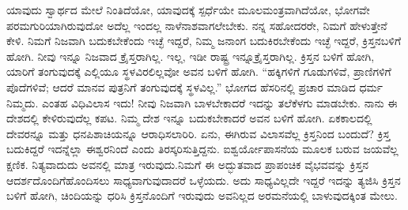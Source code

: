 ಯಾವುದು ಸ್ವಾರ್ಥದ ಮೇಲೆ ನಿಂತಿದೆಯೋ, ಯಾವುದಕ್ಕೆ ಸ್ಪರ್ಧೆಯೇ ಮೂಲ\break ಮಂತ್ರವಾಗಿದೆಯೋ, ಭೋಗವೇ ಪರಮಗುರಿಯಾಗಿರುವುದೋ ಅದೆಲ್ಲ ಇಂದಲ್ಲ ನಾಳೆ\break ನಾಶವಾಗಲೇಬೇಕು. ನನ್ನ ಸಹೋದರರೇ, ನಿಮಗೆ ಹೇಳುತ್ತೇನೆ ಕೇಳಿ. ನಿಮಗೆ ನಿಜವಾಗಿ ಬದುಕಬೇಕೆಂದು ಇಚ್ಛೆ ಇದ್ದರೆ, ನಿಮ್ಮ ಜನಾಂಗ ಬದುಕಿರಬೇಕೆಂದು ಇಚ್ಛೆ ಇದ್ದರೆ, ಕ್ರಿಸ್ತನ\break ಬಳಿಗೆ ಹೋಗಿ. ನೀವು ಇನ್ನೂ ನಿಜವಾದ ಕ್ರೈಸ್ತರಾಗಿಲ್ಲ. ಇಲ್ಲ, ಇಡೀ ರಾಷ್ಟ್ರ ಇನ್ನೂ\break ಕ್ರೈಸ್ತರಾಗಿಲ್ಲ. ಕ್ರಿಸ್ತನ ಬಳಿಗೆ ಹೋಗಿ, ಯಾರಿಗೆ ತಂಗುವುದಕ್ಕೆ ಎಲ್ಲಿಯೂ ಸ್ಥಳವಿರಲಿಲ್ಲವೋ ಅವನ ಬಳಿಗೆ ಹೋಗಿ. “ಹಕ್ಕಿಗಳಿಗೆ ಗೂಡುಗಳಿವೆ, ಪ್ರಾಣಿಗಳಿಗೆ ಪೊದೆಗಳಿವೆ; ಆದರೆ ಮಾನವ ಪುತ್ರನಿಗೆ ತಂಗುವುದಕ್ಕೆ ಸ್ಥಳವಿಲ್ಲ.” ಭೋಗದ ಹೆಸರಿನಲ್ಲಿ ಪ್ರಚಾರ ಮಾಡಿದ ಧರ್ಮ ನಿಮ್ಮದು. ಎಂತಹ ವಿಧಿವಿಲಾಸ ಇದು! ನೀವು ನಿಜವಾಗಿ ಬಾಳಬೇಕಾದರೆ ಇದನ್ನು ತಲೆಕೆಳಗು ಮಾಡಬೇಕು. ನಾನು ಈ ದೇಶದಲ್ಲಿ ಕೇಳಿರುವುದೆಲ್ಲ ಕಪಟ. ನಿಮ್ಮ ದೇಶ ಇನ್ನೂ ಬದುಕಬೇಕಾದರೆ ಅವನ ಬಳಿಗೆ ಹೋಗಿ. ಏಕಕಾಲದಲ್ಲಿ ದೇವರನ್ನೂ ಮತ್ತು ಧನಪಿಶಾಚಿಯನ್ನೂ ಆರಾಧಿಸಲಾರಿರಿ. ಏನು, ಈಗಿರುವ ವಿಲಾಸವೆಲ್ಲ ಕ್ರಿಸ್ತನಿಂದ ಬಂದುದೆ? ಕ್ರಿಸ್ತ ಬದುಕಿದ್ದರೆ ಇದನ್ನೆಲ್ಲಾ ಈಶ್ವರನಿಂದೆ ಎಂದು ತಿರಸ್ಕರಿಸುತ್ತಿದ್ದನು. ಐಶ್ವರ್ಯೋಪಾಸನೆಯ ಮೂಲಕ ಬರುವ ಜಯವೆಲ್ಲ ಕ್ಷಣಿಕ. ನಿತ್ಯವಾದುದು ಅವನಲ್ಲಿ ಮಾತ್ರ ಇರುವುದು.\break ನಿಮಗೆ ಈ ಅದ್ಭುತವಾದ ಪ್ರಾಪಂಚಿಕ ವೈಭವವನ್ನು ಕ್ರಿಸ್ತನ ಆದರ್ಶದೊಂದಿಗೆ\break ಹೊಂದಿಸಲು ಸಾಧ್ಯವಾಗುವುದಾದರೆ ಒಳ್ಳೆಯದು. ಅದು ಸಾಧ್ಯವಿಲ್ಲದೇ ಇದ್ದರೆ ಇದನ್ನು ತ್ಯಜಿಸಿ ಕ್ರಿಸ್ತನ ಬಳಿಗೆ ಹೋಗಿ, ಚಿಂದಿಯನ್ನು ಧರಿಸಿ ಕ್ರಿಸ್ತನೊಂದಿಗೆ ಇರುವುದು ಅವನಿಲ್ಲದ ಅರಮನೆಯಲ್ಲಿ ಬಾಳುವುದಕ್ಕಿಂತ ಮೇಲು.

